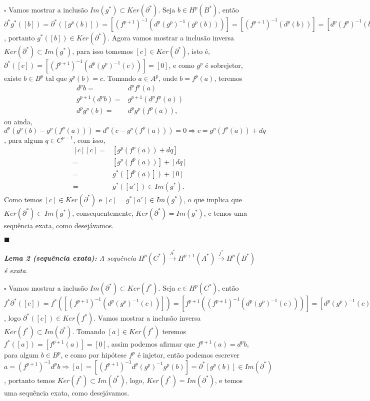 \documentclass{article}
\begin{document}
	$\square$ Vamos mostrar a inclusão $Im(g^{*}) \subset Ker(\partial^{*})$. Seja $b \in H^{p}(B^{*})$, então $\partial^{*}g^{*}([b]) = \partial^{*}([g^{p}(b)]) = [(f^{p+1})^{-1}(d^{p}(g^{p})^{-1}(g^{p}(b)))] = [(f^{p+1})^{-1}(d^{p}(b))] = [d^{p}(f^{p})^{-1}(b)] = [0]$, portanto $g^{*}([b]) \in Ker(\partial^{*})$. Agora vamos mostrar a inclusão inversa $Ker(\partial^{*}) \subset Im(g^{*})$, para isso tomemos $[c] \in Ker(\partial^{*})$, isto é, $\partial^{*}([c]) = [(f^{p+1})^{-1}(d^{p}(g^{p})^{-1}(c))] = [0]$, e como $g^{p}$ é sobrejetor, existe $b \in B^{p}$ tal que $g^{p}(b) = c$. Tomando $a \in A^{p}$, onde $b = f^{p}(a)$, teremos 
	$$
	\begin{aligned}
	d^{p}b =& d^{p}f^{p}(a)
	\\
	g^{p+1}(d^{p}b) =&  g^{p+1}(d^{p}f^{p}(a)) 
	\\
	d^{p}g^{p}(b) =& d^{p}g^{p}(f^{p}(a)),
	\end{aligned}
	$$
	ou ainda, $d^{p}(g^{p}(b) - g^{p}(f^{p}(a)))=d^{p}(c - g^{p}(f^{p}(a)))=0 \Rightarrow c = g^{p}(f^{p}(a)) + dq$, para algum $q \in C^{p-1}$, com isso, 
	$$
	\begin{aligned}
	[c][c] =& [g^{p}(f^{p}(a)) + dq] 
	\\
	=& [g^{p}(f^{p}(a))] + [dq] 
	\\
	=& g^{*}([f^{p}(a)]) +[0] 
	\\
	=& g^{*}([a']) \in  Im(g^{*}).
	\end{aligned}
	$$
	Como temos $[c] \in Ker(\partial^{*})$ e $[c] = g^{*}[a'] \in Im(g^{*})$, o que implica que $Ker(\partial^{*}) \subset Im(g^{*})$, consequentemente, $Ker(\partial^{*}) = Im(g^{*})$, e temos uma sequência exata, como desejávamos. 
	
	$\blacksquare$
	
	\vspace{2mm}
	\textit{\textbf{Lema 2 (sequência exata):} A sequência $H^{p}(C^{*}) \xrightarrow{\partial^{*}} H^{p+1}(A^{*}) \xrightarrow{f^{*}}  H^{p}(B^{*})$ é exata.}
	
	$\square$ Vamos mostrar a inclusão  $Im(\partial^{*}) \subset Ker(f^{*})$. Seja $c \in H^{p}(C^{*})$, então $f^{*}\partial^{*}([c]) = f^{*}([(f^{p+1})^{-1}(d^{p}(g^{p})^{-1}(c))]) = [f^{p+1}((f^{p+1})^{-1}(d^{p}(g^{p})^{-1}(c)))] = [d^{p}(g^{p})^{-1}(c)] = [0]$, logo $\partial^{*}([c]) \in Ker(f^{*})$. Vamos mostrar a inclusão inversa $Ker(f^{*}) \subset Im(\partial^{*}) $. Tomando $[a] \in Ker(f^{*})$ teremos $f^{*}([a]) = [f^{p+1}(a)] = [0]$, assim podemos afirmar que $f^{p+1}(a) = d^{p}b$, para algum $b \in B^{p}$, e como por hipótese $f^{p}$ é injetor, então podemos escrever $a = (f^{p+1})^{-1}d^{p}b \Rightarrow [a] = [(f^{p+1})^{-1}d^{p}(g^{p})^{-1}g^{p}(b)] = \partial^{*}[g^{p}(b)] \in Im(\partial^{*})$, portanto temos $Ker(f^{*}) \subset Im(\partial^{*})$, logo, $Ker(f^{*}) = Im(\partial^{*})$, e temos uma sequência exata, como desejávamos. 
	
\end{document}
